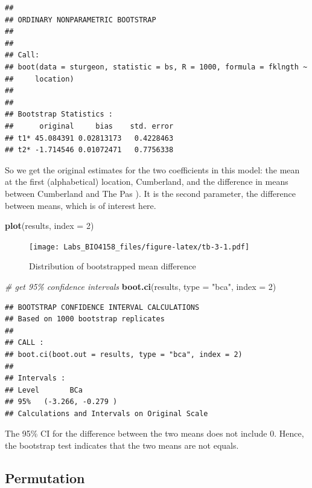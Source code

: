 \documentclass[
  12pt,
]{book}
\newenvironment{Shaded}{\begin{snugshade}}{\end{snugshade}}
\newcommand{\CommentTok}[1]{\textcolor[rgb]{0.56,0.35,0.01}{\textit{#1}}}
\newcommand{\DataTypeTok}[1]{\textcolor[rgb]{0.13,0.29,0.53}{#1}}
\newcommand{\DecValTok}[1]{\textcolor[rgb]{0.00,0.00,0.81}{#1}}
\newcommand{\KeywordTok}[1]{\textcolor[rgb]{0.13,0.29,0.53}{\textbf{#1}}}
\newcommand{\NormalTok}[1]{#1}
\newcommand{\StringTok}[1]{\textcolor[rgb]{0.31,0.60,0.02}{#1}}
\begin{document}
\begin{verbatim}
## 
## ORDINARY NONPARAMETRIC BOOTSTRAP
## 
## 
## Call:
## boot(data = sturgeon, statistic = bs, R = 1000, formula = fklngth ~ 
##     location)
## 
## 
## Bootstrap Statistics :
##      original     bias    std. error
## t1* 45.084391 0.02813173   0.4228463
## t2* -1.714546 0.01072471   0.7756338
\end{verbatim}

So we get the original estimates for the two coefficients in this model: the mean at the first (alphabetical) location, Cumberland, and the difference in means between Cumberland and The Pas ). It is the second parameter, the difference between means, which is of interest here.

\begin{Shaded}
\begin{Highlighting}[]
\KeywordTok{plot}\NormalTok{(results, }\DataTypeTok{index =} \DecValTok{2}\NormalTok{)}
\end{Highlighting}
\end{Shaded}

\begin{figure}
\centering
\texttt{[image: Labs\_BIO4158\_files/figure-latex/tb-3-1.pdf]}
\caption{\label{fig:tb-3}Distribution of bootstrapped mean difference}
\end{figure}

\begin{Shaded}
\begin{Highlighting}[]
\CommentTok{\# get 95\% confidence intervals}
\KeywordTok{boot.ci}\NormalTok{(results, }\DataTypeTok{type =} \StringTok{"bca"}\NormalTok{, }\DataTypeTok{index =} \DecValTok{2}\NormalTok{)}
\end{Highlighting}
\end{Shaded}

\begin{verbatim}
## BOOTSTRAP CONFIDENCE INTERVAL CALCULATIONS
## Based on 1000 bootstrap replicates
## 
## CALL : 
## boot.ci(boot.out = results, type = "bca", index = 2)
## 
## Intervals : 
## Level       BCa          
## 95%   (-3.266, -0.279 )  
## Calculations and Intervals on Original Scale
\end{verbatim}

The 95\% CI for the difference between the two means does not include 0. Hence, the bootstrap test indicates that the two means are not equals.

\hypertarget{permutation}{%
\subsection{Permutation}\label{permutation}}
\end{document}
